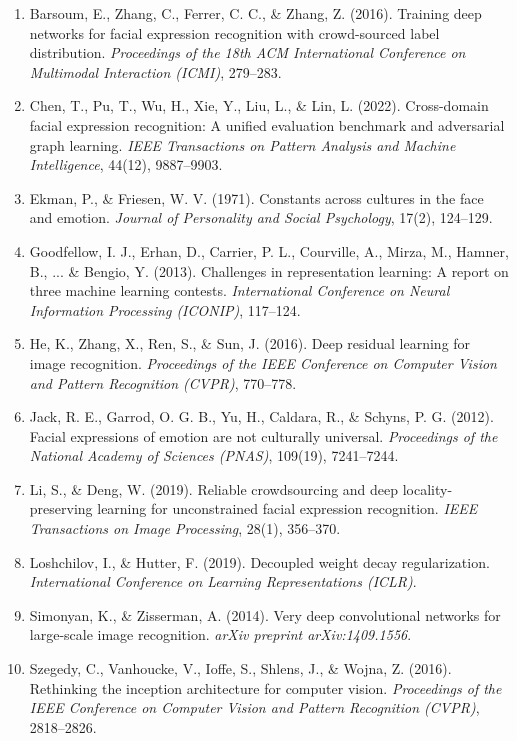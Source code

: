 \documentclass[12pt,a4paper]{article}
\begin{document}
\begin{enumerate}
    \item Barsoum, E., Zhang, C., Ferrer, C. C., \& Zhang, Z. (2016). Training deep networks for facial expression recognition with crowd-sourced label distribution. \textit{Proceedings of the 18th ACM International Conference on Multimodal Interaction (ICMI)}, 279--283.
    \item Chen, T., Pu, T., Wu, H., Xie, Y., Liu, L., \& Lin, L. (2022). Cross-domain facial expression recognition: A unified evaluation benchmark and adversarial graph learning. \textit{IEEE Transactions on Pattern Analysis and Machine Intelligence}, 44(12), 9887--9903.
    \item Ekman, P., \& Friesen, W. V. (1971). Constants across cultures in the face and emotion. \textit{Journal of Personality and Social Psychology}, 17(2), 124--129.
    \item Goodfellow, I. J., Erhan, D., Carrier, P. L., Courville, A., Mirza, M., Hamner, B., ... \& Bengio, Y. (2013). Challenges in representation learning: A report on three machine learning contests. \textit{International Conference on Neural Information Processing (ICONIP)}, 117--124.
    \item He, K., Zhang, X., Ren, S., \& Sun, J. (2016). Deep residual learning for image recognition. \textit{Proceedings of the IEEE Conference on Computer Vision and Pattern Recognition (CVPR)}, 770--778.
    \item Jack, R. E., Garrod, O. G. B., Yu, H., Caldara, R., \& Schyns, P. G. (2012). Facial expressions of emotion are not culturally universal. \textit{Proceedings of the National Academy of Sciences (PNAS)}, 109(19), 7241--7244.
    \item Li, S., \& Deng, W. (2019). Reliable crowdsourcing and deep locality-preserving learning for unconstrained facial expression recognition. \textit{IEEE Transactions on Image Processing}, 28(1), 356--370.
    \item Loshchilov, I., \& Hutter, F. (2019). Decoupled weight decay regularization. \textit{International Conference on Learning Representations (ICLR)}.
    \item Simonyan, K., \& Zisserman, A. (2014). Very deep convolutional networks for large-scale image recognition. \textit{arXiv preprint arXiv:1409.1556}.
    \item Szegedy, C., Vanhoucke, V., Ioffe, S., Shlens, J., \& Wojna, Z. (2016). Rethinking the inception architecture for computer vision. \textit{Proceedings of the IEEE Conference on Computer Vision and Pattern Recognition (CVPR)}, 2818--2826.

\end{enumerate}
\end{document}
